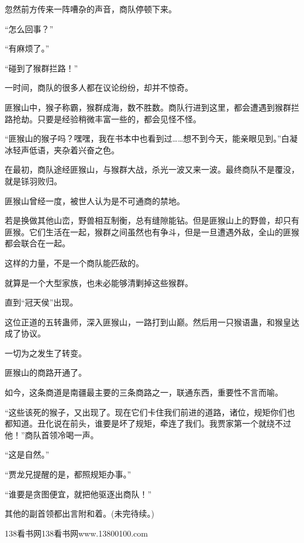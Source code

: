 \begin{this_body}
忽然前方传来一阵嘈杂的声音，商队停顿下来。

“怎么回事？”

“有麻烦了。”

“碰到了猴群拦路！”

一时间，商队的很多人都在议论纷纷，却并不惊奇。

匪猴山中，猴子称霸，猴群成海，数不胜数。商队行进到这里，都会遭遇到猴群拦路抢劫。只要是经验稍微丰富一些的，都会见怪不怪。

“匪猴山的猴子吗？嘿嘿，我在书本中也看到过……想不到今天，能亲眼见到。”白凝冰轻声低语，夹杂着兴奋之色。

在最初，商队途经匪猴山，与猴群大战，杀光一波又来一波。最终商队不是覆没，就是铩羽败归。

匪猴山曾经一度，被世人认为是不可通商的禁地。

若是换做其他山峦，野兽相互制衡，总有缝隙能钻。但是匪猴山上的野兽，却只有匪猴。它们生活在一起，猴群之间虽然也有争斗，但是一旦遭遇外敌，全山的匪猴都会联合在一起。

这样的力量，不是一个商队能匹敌的。

就算是一个大型家族，也未必能够清剿掉这些猴群。

直到“冠天侯”出现。

这位正道的五转蛊师，深入匪猴山，一路打到山巅。然后用一只猴语蛊，和猴皇达成了协议。

一切为之发生了转变。

匪猴山的商路开通了。

如今，这条商道是南疆最主要的三条商路之一，联通东西，重要性不言而喻。

“这些该死的猴子，又出现了。现在它们卡住我们前进的道路，诸位，规矩你们也都知道。丑化说在前头，谁要是坏了规矩，牵连了我们。我贾家第一个就绕不过他！”商队首领冷喝一声。

“这是自然。”

“贾龙兄提醒的是，都照规矩办事。”

“谁要是贪图便宜，就把他驱逐出商队！”

其他的副首领都出言附和着。(未完待续。)

138看书网138看书网www.13800100.com

\end{this_body}

